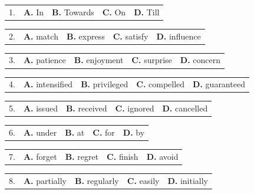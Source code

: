 \documentclass[UTF8,11pt]{ctexart}
\begin{document}
\noindent\begin{tabularx}{\linewidth}{@{}lXXXX@{}}1. & \textbf{A.} In & \textbf{B.} Towards & \textbf{C.} On & \textbf{D.} Till\\\end{tabularx}\par

\noindent\begin{tabularx}{\linewidth}{@{}lXXXX@{}}2. & \textbf{A.} match & \textbf{B.} express & \textbf{C.} satisfy & \textbf{D.} influence\\\end{tabularx}\par

\noindent\begin{tabularx}{\linewidth}{@{}lXXXX@{}}3. & \textbf{A.} patience & \textbf{B.} enjoyment & \textbf{C.} surprise & \textbf{D.} concern\\\end{tabularx}\par

\noindent\begin{tabularx}{\linewidth}{@{}lXXXX@{}}4. & \textbf{A.} intensified & \textbf{B.} privileged & \textbf{C.} compelled & \textbf{D.} guaranteed\\\end{tabularx}\par

\noindent\begin{tabularx}{\linewidth}{@{}lXXXX@{}}5. & \textbf{A.} issued & \textbf{B.} received & \textbf{C.} ignored & \textbf{D.} cancelled\\\end{tabularx}\par

\noindent\begin{tabularx}{\linewidth}{@{}lXXXX@{}}6. & \textbf{A.} under & \textbf{B.} at & \textbf{C.} for & \textbf{D.} by\\\end{tabularx}\par

\noindent\begin{tabularx}{\linewidth}{@{}lXXXX@{}}7. & \textbf{A.} forget & \textbf{B.} regret & \textbf{C.} finish & \textbf{D.} avoid\\\end{tabularx}\par

\noindent\begin{tabularx}{\linewidth}{@{}lXXXX@{}}8. & \textbf{A.} partially & \textbf{B.} regularly & \textbf{C.} easily & \textbf{D.} initially\\\end{tabularx}\par
\end{document}

